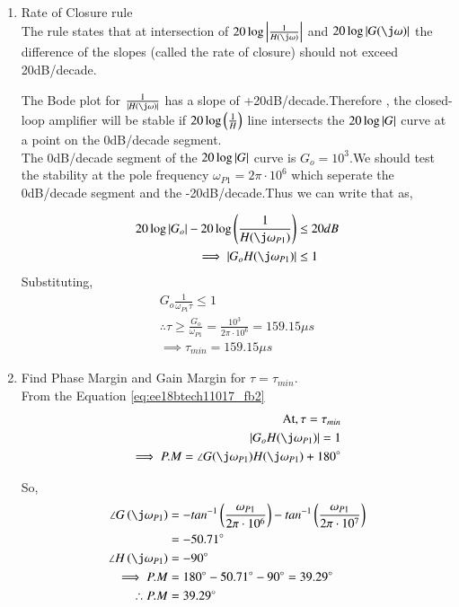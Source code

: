 \begin{enumerate}[label=\thesection.\arabic*.,ref=\thesection.\theenumi]
\item Rate of Closure rule \\
\solution The rule states that at intersection of $20\log\abs{\frac{1}{H(\j\omega)}}$ and $20\log\abs{G(\j\omega)}$ the difference of the slopes (called the rate of closure) should not exceed 20dB/decade.

The Bode plot for $\frac{1}{\abs{H\brak{\j\omega}}}$ has a slope of +20dB/decade.Therefore , the closed-loop amplifier will be stable if $20\log\left(\frac{1}{H}\right)$ line intersects the $20\log\left\vert G\right\vert$ curve at a point on the 0dB/decade segment.\\
The 0dB/decade segment of the $20\log\left\vert G\right\vert$ curve is $G_{o}=10^{3}$.We should test the stability at the pole frequency $\omega_{P1}=2\pi\cdot10^{6}$ which seperate the 0dB/decade segment and the -20dB/decade.Thus we can write that as,

\begin{align}
20\log\abs{G_{o}}-20\log\brak{\frac{1}{H(\j\omega_{P1})}} &\leq 20dB \\
\implies \abs{G_{o}H(\j\omega_{P1})} & \leq 1
\end{align}
Substituting,
\begin{align}
G_{o} \frac{1}{\omega_{P1} \tau} \leq 1 \\
\therefore \tau \geq \frac{G_{o}}{\omega_{P1}}= \frac{10^{3}}{2\pi\cdot 10^{6}}=159.15 \mu s \\
\label{eq:ee18btech11017_fb2}
\implies \tau_{min}=159.15 \mu s
\end{align}


\item
Find Phase Margin and Gain Margin for $\tau=\tau_{min}$. \\
\solution 
From the Equation \eqref{eq:ee18btech11017_fb2} 
\begin{align}
\text{ At} , \tau =\tau_{min} \\
\abs{G_{o}H(\j\omega_{P1})} =1 \\
\implies P.M = \angle G(\j\omega_{P1})H(\j\omega_{P1})+180\degree
\end{align}

So,
\begin{align}
\angle G\brak{\j\omega_{P1}} &= -tan^{-1}\brak{\frac{\omega_{P1}}{2\pi\cdot10^{6}}}-tan^{-1}\brak{\frac{\omega_{P1}}{2\pi\cdot10^{7}}} \\
&=-50.71\degree \\
\angle H\brak{\j\omega_{P1}} &=-90\degree \\
\implies P.M &= 180\degree-50.71\degree-90\degree =39.29\degree \\
\therefore P.M &= 39.29\degree
\end{align}


\end{enumerate}
